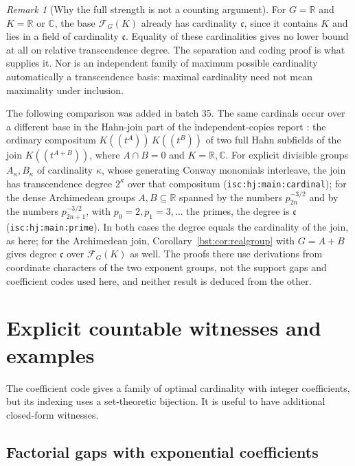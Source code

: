 \documentclass[11pt,letterpaper]{article}
\theoremstyle{definition}
\theoremstyle{remark}
\newtheorem{remark}[theorem]{Remark}
\newcommand{\R}{\mathbb R}
\newcommand{\C}{\mathbb C}
\newcommand{\HH}[2]{#1((t^{#2}))}
\newcommand{\FF}[2]{\mathcal F_{#2}(#1)}
\newcommand{\cc}{\mathfrak c}
\begin{document}
\begin{remark}[Why the full strength is not a counting argument]
For $G=\R$ and $K=\R$ or $\C$, the base $\FF KG$ already has cardinality
$\cc$, since it contains $K$ and lies in a field of cardinality $\cc$.
Equality of these cardinalities gives no lower bound at all on relative
transcendence degree. The separation and coding proof is what supplies it.
Nor is an independent family of maximum possible cardinality automatically
a transcendence basis: maximal cardinality need not mean maximality under
inclusion.
\end{remark}

The following comparison was added in batch 35. The same cardinals occur over
a different base in the Hahn-join part of the independent-copies report
\cite{RepoIsc}: the ordinary compositum $\HH KA\,\HH KB$ of two full Hahn
subfields of the join $\HH K{A+B}$, where $A\cap B=0$ and $K=\R,\C$. For
explicit divisible groups $A_\kappa,B_\kappa$ of cardinality $\kappa$, whose
generating Conway monomials interleave, the join has transcendence degree
$2^\kappa$ over that compositum (\texttt{isc:hj:main:cardinal}); for the
dense Archimedean groups $A,B\subseteq\R$ spanned by the numbers
$p_{2n}^{-3/2}$ and by the numbers $p_{2n+1}^{-3/2}$, with $p_0=2,p_1=3,\ldots$
the primes, the degree is $\cc$ (\texttt{isc:hj:main:prime}). In both cases
the degree equals the cardinality of the join, as here; for the Archimedean
join, Corollary~\ref{bst:cor:realgroup} with $G=A+B$ gives degree $\cc$ over
$\FF KG$ as well. The proofs there use derivations from coordinate characters
of the two exponent groups, not the support gaps and coefficient codes used
here, and neither result is deduced from the other.

\section{Explicit countable witnesses and examples}\label{bst:sec:examples}

The coefficient code gives a family of optimal cardinality with integer
coefficients, but its indexing uses a set-theoretic bijection. It is useful
to have additional closed-form witnesses.

\subsection{Factorial gaps with exponential coefficients}
\end{document}
